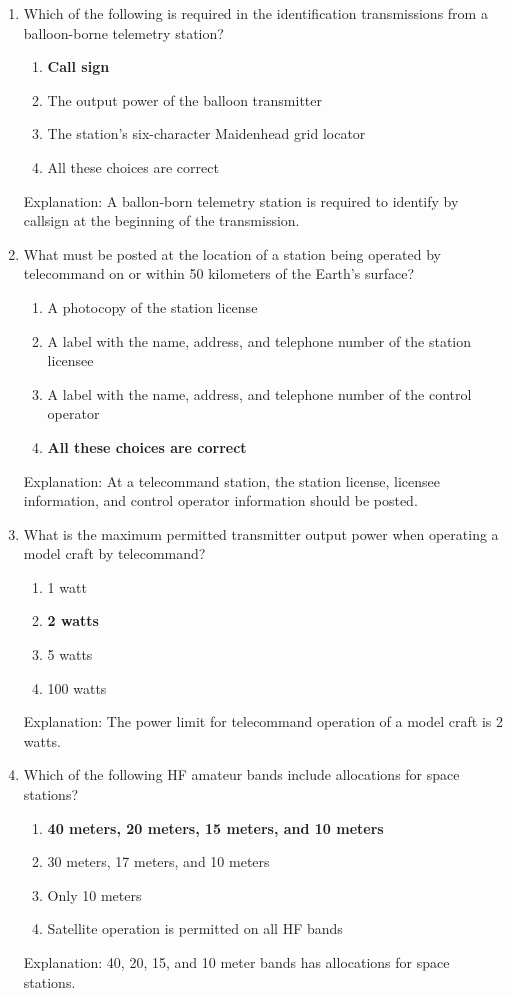 \begin{enumerate}
    \item Which of the following is required in the identification transmissions from a balloon-borne telemetry station?
       \begin{enumerate}
          \item \textbf {Call sign}
        \item  The output power of the balloon transmitter
        \item  The station's six-character Maidenhead grid locator
        \item  All these choices are correct
    \end{enumerate}
         \textcolor{myred}{Explanation:}
    A ballon-born telemetry station is required to identify by callsign at the beginning of the transmission.
    
        \item What must be posted at the location of a station being operated by telecommand on or within 50 kilometers of the Earth's surface?
      \begin{enumerate}
        \item A photocopy of the station license
        \item  A label with the name, address, and telephone number of the station licensee
    \item  A label with the name, address, and telephone number of the control operator
      \item \textbf {All these choices are correct}
    \end{enumerate}
          \textcolor{myred}{Explanation:}
     At a telecommand station, the station license, licensee information, and control operator information should be posted.
      
        \item What is the maximum permitted transmitter output power when operating a model craft by telecommand?
       \begin{enumerate}
         \item 1 watt
        \item \textbf {2 watts}
        \item  5 watts
        \item  100 watts
    \end{enumerate}
          \textcolor{myred}{Explanation:}
       The power limit for telecommand operation of a model craft is 2 watts.
       
    \item Which of the following HF amateur bands include allocations for space stations?
      \begin{enumerate}
    \item \textbf {40 meters, 20 meters, 15 meters, and 10 meters}
        \item  30 meters, 17 meters, and 10 meters
        \item  Only 10 meters
        \item  Satellite operation is permitted on all HF bands
    \end{enumerate}
       \textcolor{myred}{Explanation:}
    40, 20, 15, and 10 meter bands has allocations for space stations.


\end{enumerate}
